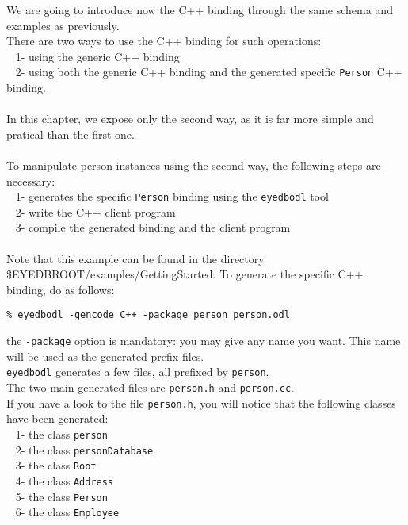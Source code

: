 We are going to introduce now the C++ binding through the same schema
and examples as previously.
\\
There are two ways to use the C++ binding for such operations: \\
\mbox{ } 1- using the generic C++ binding\\
\mbox{ } 2- using both the generic C++ binding and the generated specific
\texttt{Person} C++ binding.\\
\\
In this chapter, we expose only the second way, as it is far more
simple and pratical than the first one.
\\
\\
To manipulate person instances using the second way, the following steps
are necessary:
\\
\mbox{ } 1- generates the specific \texttt{Person} binding using the \texttt{eyedbodl}
tool\\
\mbox{ } 2- write the C++ client program\\
\mbox{ } 3- compile the generated binding and the client program\\
\\
Note that this example can be found in the directory \$EYEDBROOT/examples/GettingStarted.
To generate the specific C++ binding, do as follows:
\verbsize \begin{verbatim}
% eyedbodl -gencode C++ -package person person.odl
\end{verbatim}
\normalsize
the \texttt{-package} option is mandatory: you may give any name you want.
This name will be used as the generated prefix files.
\\
\texttt{eyedbodl} generates a few files, all prefixed by \texttt{person}.\\
The two main generated files are \texttt{person.h} and \texttt{person.cc}.
\\
If you have a look to the file \texttt{person.h},
you will notice that the following classes have been generated:\\
\mbox{ } 1- the class \texttt{person}\\
\mbox{ } 2- the class \texttt{personDatabase}\\
\mbox{ } 3- the class \texttt{Root}\\
\mbox{ } 4- the class \texttt{Address}\\
\mbox{ } 5- the class \texttt{Person}\\
\mbox{ } 6- the class \texttt{Employee}\\
